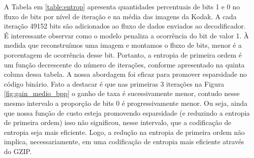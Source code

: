A Tabela em \ref{table:entrop} apresenta quantidades percentuais de bits 1 e 0 no fluxo de bits por nível de iteração e na média das imagens da Kodak. A cada iteração 49152 bits são adicionados ao fluxo de dados enviados ao decodificador. 
É interessante observar como o modelo penaliza a ocorrência do bit de valor 1. À medida que reconstruímos uma imagem e montamos o fluxo de bits, menor é a porcentagem de ocorrência desse bit.  Portanto, a entropia de primeira ordem é um função decrescente do número de iterações, conforme apresentado na quinta coluna dessa tabela.  A nossa  abordagem foi eficaz para promover esparsidade no código binário. 
Fato a destacar é que nas primeiras 3 iterações na Figura \ref{fig:gain_medio_bpp} o ganho de taxa é sucessivamente menor, contudo nesse mesmo intervalo a proporção de bits 0 é progressivamente menor.  Ou seja, ainda que nossa função de custo esteja promovendo esparsidade (e reduzindo a entropia de primeira ordem) isso não significou, nesse intervalo, que a codificação de entropia seja mais eficiente.  
Logo, a redução na entropia de primeira ordem não implica, necessariamente, em uma codificação de entropia mais eficiente através do GZIP. 




